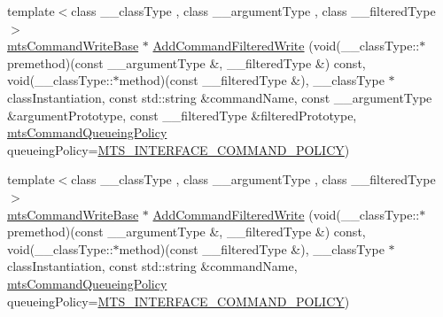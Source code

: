 {\bf }\par
\begin{DoxyCompactItemize}
\item 
{\footnotesize template$<$class \+\_\+\+\_\+class\+Type , class \+\_\+\+\_\+argument\+Type , class \+\_\+\+\_\+filtered\+Type $>$ }\\\hyperlink{classmts_command_write_base}{mts\+Command\+Write\+Base} $\ast$ \hyperlink{classmts_interface_provided_a5767c658f8ecad34cb84bd54032498a9}{Add\+Command\+Filtered\+Write} (void(\+\_\+\+\_\+class\+Type\+::$\ast$premethod)(const \+\_\+\+\_\+argument\+Type \&, \+\_\+\+\_\+filtered\+Type \&) const, void(\+\_\+\+\_\+class\+Type\+::$\ast$method)(const \+\_\+\+\_\+filtered\+Type \&), \+\_\+\+\_\+class\+Type $\ast$class\+Instantiation, const std\+::string \&command\+Name, const \+\_\+\+\_\+argument\+Type \&argument\+Prototype, const \+\_\+\+\_\+filtered\+Type \&filtered\+Prototype, \hyperlink{mts_forward_declarations_8h_aa2ac24035e136fa1689dcc2854c63fc7}{mts\+Command\+Queueing\+Policy} queueing\+Policy=\hyperlink{mts_forward_declarations_8h_aa2ac24035e136fa1689dcc2854c63fc7a4f444b4120a5e2efd084e2e5a214f5c8}{M\+T\+S\+\_\+\+I\+N\+T\+E\+R\+F\+A\+C\+E\+\_\+\+C\+O\+M\+M\+A\+N\+D\+\_\+\+P\+O\+L\+I\+C\+Y})
\item 
{\footnotesize template$<$class \+\_\+\+\_\+class\+Type , class \+\_\+\+\_\+argument\+Type , class \+\_\+\+\_\+filtered\+Type $>$ }\\\hyperlink{classmts_command_write_base}{mts\+Command\+Write\+Base} $\ast$ \hyperlink{classmts_interface_provided_a215a464ca57a8df980d1f68415f24795}{Add\+Command\+Filtered\+Write} (void(\+\_\+\+\_\+class\+Type\+::$\ast$premethod)(const \+\_\+\+\_\+argument\+Type \&, \+\_\+\+\_\+filtered\+Type \&) const, void(\+\_\+\+\_\+class\+Type\+::$\ast$method)(const \+\_\+\+\_\+filtered\+Type \&), \+\_\+\+\_\+class\+Type $\ast$class\+Instantiation, const std\+::string \&command\+Name, \hyperlink{mts_forward_declarations_8h_aa2ac24035e136fa1689dcc2854c63fc7}{mts\+Command\+Queueing\+Policy} queueing\+Policy=\hyperlink{mts_forward_declarations_8h_aa2ac24035e136fa1689dcc2854c63fc7a4f444b4120a5e2efd084e2e5a214f5c8}{M\+T\+S\+\_\+\+I\+N\+T\+E\+R\+F\+A\+C\+E\+\_\+\+C\+O\+M\+M\+A\+N\+D\+\_\+\+P\+O\+L\+I\+C\+Y})
\end{DoxyCompactItemize}


